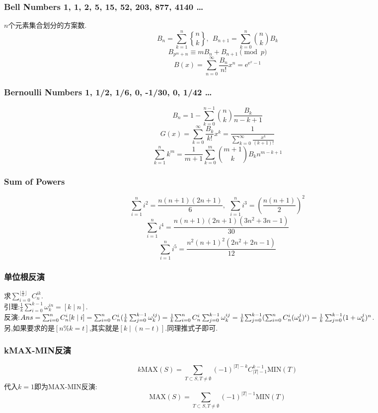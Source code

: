\begin{small}
\subsubsection{Bell Numbers 1, 1, 2, 5, 15, 52, 203, 877, 4140 \dots}
$n$个元素集合划分的方案数.
\[ B_n=\sum_{k=1}^{n}{n\brace k},\ \ B_{n+1} = \sum_{k=0}^n{n \choose k}B_k \]
\[ B_{p^m+n} \equiv mB_n+B_{n+1} \pmod{p} \]
\[B(x)=\sum_{n=0}^{\infty}\frac{B_n}{n!}x^n=\mathrm{e}^{\mathrm{e}^x-1}\]
\subsubsection{Bernoulli Numbers 1, 1/2, 1/6, 0, -1/30, 0, 1/42 \dots}
\[ B_n = 1 - \sum_{k=0}^{n-1}{n \choose k}\frac{B_k}{n-k+1} \]
\[ G(x) = \sum_{k=0}^{\infty}\frac{B_k}{k!}x^k
= \frac{1}{\sum_{k=0}^{\infty}\frac{x^k}{(k+1)!}} \]
\[ \sum_{k=1}^nk^m = \frac{1}{m+1}\sum_{k=0}^m{m+1 \choose k}B_kn^{m-k+1} \]
\subsubsection{Sum of Powers}
\[\sum_{i=1}^ni^2=\frac{n(n+1)(2n+1)}{6},\ \ \sum_{i=1}^ni^3=(\frac{n(n+1)}{2})^2\]
\[\sum_{i=1}^ni^4=\frac{n(n+1)(2n+1)(3n^2+3n-1)}{30}\]
\[\sum_{i=1}^ni^5=\frac{n^2(n+1)^2(2n^2+2n-1)}{12}\]
\subsubsection{单位根反演}
求$\sum_{i=0}^{\lfloor \frac{n}{k} \rfloor} {C_n^{ik}}$.\\
引理:$\frac{1}{k} \sum_{i=0}^{k-1} \omega_{k}^{in} = [k \mid n]$.\\
反演:$Ans = \sum_{i=0}^n{C_n^i [k \mid i]} \\= \sum_{i=0}^n{C_n^i(\frac{1}{k}\sum_{j=0}^{k-1}{\omega_k^{ij}})} \\= \frac{1}{k} {\sum_{i=0}^{n}C_n^i \sum_{j=0}^{k-1} \omega_k^{ij}} \\= \frac{1}{k} {\sum_{j=0}^{k-1}(\sum_{i=0}^n C_n^i(\omega_k^j)^i)} \\= \frac{1}{k} \sum_{j=0}^{k-1} (1+\omega_k^j)^n$.\\
另,如果要求的是$[n \% k = t]$,其实就是$[k \mid (n-t)]$.同理推式子即可.
\subsubsection{kMAX-MIN反演}
\[k \mathrm{MAX}(S)=\sum_{T\subset S, T\neq \emptyset}(-1)^{|T|-k}C_{|T|-1}^{k-1}\mathrm{MIN}(T)\]
代入$k=1$即为MAX-MIN反演:
\[\mathrm{MAX}(S)=\sum_{T\subset S, T\neq \emptyset}(-1)^{|T|-1}\mathrm{MIN}(T)\]

\end{small}
